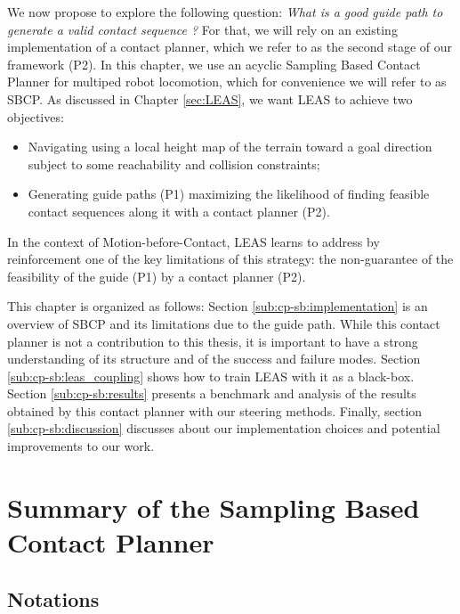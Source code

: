 We now propose to explore the following question: \textit{What is a good guide path to generate a valid contact sequence ?}
For that, we will rely on an existing implementation of a contact planner, which we refer to as the second stage of our framework (P2). 
In this chapter, we use an acyclic Sampling Based Contact Planner \cite{AcyclicCP} for multiped robot locomotion, which for convenience we will refer to as SBCP.
As discussed in Chapter \ref{sec:LEAS}, we want LEAS to achieve two objectives:
\begin{itemize}
    \item Navigating using a local height map of the terrain toward a goal direction subject to some reachability and collision constraints;
    \item Generating guide paths (P1) maximizing the likelihood of finding feasible contact sequences along it with a contact planner (P2).
\end{itemize}
In the context of Motion-before-Contact, LEAS learns to address by reinforcement one of the key limitations of this strategy: the non-guarantee of the feasibility of the guide (P1) by a contact planner (P2).

This chapter is organized as follows:
Section \ref{sub:cp-sb:implementation} is an overview of SBCP and its limitations due to the guide path. While this contact planner is not a contribution to this thesis, it is important to have a strong understanding of its structure and of the success and failure modes.
Section \ref{sub:cp-sb:leas_coupling} shows how to train LEAS with it as a black-box. 
Section \ref{sub:cp-sb:results} presents a benchmark and analysis of the results obtained by this contact planner with our steering methods.
Finally, section \ref{sub:cp-sb:discussion} discusses about our implementation choices and potential improvements to our work.


\section{Summary of the Sampling Based Contact Planner \label{sub:cp-sb:implementation}}

\subsection{Notations}

